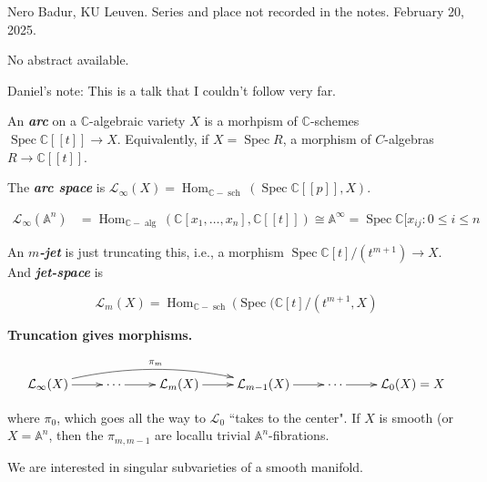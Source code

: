 \noindent
Nero Badur, KU Leuven.
Series and place not recorded in the notes.
February 20, 2025.

\medskip\noindent
No abstract available.

\medskip\noindent
Daniel's note: This is a talk that I couldn't
follow very far.

\medskip{}

\begin{definition}
\label{definition-badur-1}
An \textit{\textbf{arc}} on a
$\mathbb{C}$-algebraic variety $X$ is a
morhpism of $\mathbb{C}$-schemes
$\operatorname{Spec}\mathbb{C}[[t]] \to X$.
Equivalently, if $X = \operatorname{Spec} R$,
a morphism of $C$-algebras $R \to
\mathbb{C}[[t]]$.

The \textit{\textbf{arc space}} is
$\mathcal{L}_\infty(X) =
\operatorname{Hom}_{\mathbb{C}-
\operatorname{sch}}(\operatorname{Spec}
\mathbb{C}[[p ]],X)$.
\end{definition}

\medskip{}
$$
\begin{aligned}
\mathcal{L}_{\infty}(\mathbb{A}^n)&=
\operatorname{Hom}_{\mathbb{C}-
\operatorname{alg}}(\mathbb{C}[x_1,\ldots,
x_n],\mathbb{C}[
[ t ] ]) \cong \mathbb{A}^\infty=
\operatorname{Spec} \mathbb{C}[x_{ij}:0 \leq
i \leq n
\end{aligned}
$$

\begin{definition}
\label{definition-badur-2}
An \textit{\textbf{$m$-jet}} is just
truncating this, i.e., a morphism
$\operatorname{Spec}\mathbb{C}[t]/(t^{m+1})
\to X$. And \textit{\textbf{jet-space}} is

$$
\mathcal{L}_m(X)=
\operatorname{Hom}_{\mathbb{C}-
\operatorname{sch}}(\operatorname{Spec}(
\mathbb{C}[t]/(t^{m+1},X)
$$

\end{definition}

\textbf{Truncation gives morphisms.}

$$
\xymatrix{\mathcal{L}_\infty(X)\ar[r]
\ar@/^1pc/[rrr]^{\pi_m}&\cdots\ar[r]&
\mathcal{L}_m(X)\ar[r]&\mathcal{L}_{m-1}(X)
\ar[r]&\cdots\ar[r]&\mathcal{L}_0(X)=X}
$$

where $\pi_0$, which goes all the way to
$\mathcal{L}_0$ ``takes to the center".
\medskip{}
If $X$ is smooth (or $X= \mathbb{A}^n$, then
the  $\pi_{m,m-1}$ are locallu trivial
$\mathbb{A}^n$-fibrations.

{We are interested in singular subvarieties
of a smooth manifold.}

